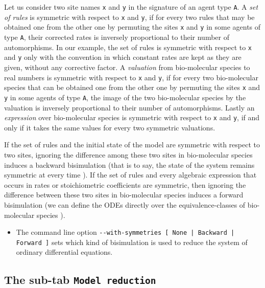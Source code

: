 \documentclass[11pt]{book}
\def\ttt#1{\texttt{#1}}
\begin{document}
Let us consider two site names \ttt{x} and \ttt{y} in the signature of an agent type \ttt{A}.
A \emph{set of rules} is symmetric with respect to \ttt{x} and \ttt{y}, if for every two rules that may be obtained one from the other one by permuting the sites \ttt{x} and \ttt{y} in some agents of type \ttt{A}, their corrected rates is inversely proportional to their number of automorphisms.
In our example,  the set of rules is symmetric with respect to \ttt{x} and \ttt{y} only with the convention in which constant rates are kept as they are given, without any corrective factor. A \emph{valuation} from bio-molecular species to real numbers is symmetric with respect to \ttt{x} and \ttt{y}, if for every two bio-molecular species that can be obtained one from the other one by permuting the sites \ttt{x} and \ttt{y} in some agents of type \ttt{A}, the image of the two bio-molecular species by the valuation is inversely proportional to their number of automorphisms. Lastly an \emph{expression} over bio-molecular species is symmetric with respect to \ttt{x} and \ttt{y}, if and only if it takes the same values for every two symmetric valuations.

If the set of rules and the initial state of the model are symmetric with respect to two sites, ignoring the difference among these two sites in bio-molecular species induces a backward bisimulation (that is to say, the state of the system remains symmetric at every time \cite{buchholz_lump}). If the set of rules and every algebraic expression that occurs in rates or stoichiometric coefficients are symmetric, then ignoring the difference between these two sites in bio-molecular species induces a forward bisimulation (we can define the ODEs directly over the equivalence-classes of bio-molecular species \cite{buchholz_lump}).

\begin{itemize}
  \item
The command line option \texttt{-{}-with-symmetries [ None | Backward | Forward ]} sets which kind of bisimulation is used to reduce the system of ordinary differential equations.
\end{itemize}

\subsection{The sub-tab \texttt{Model reduction}}
\end{document}
